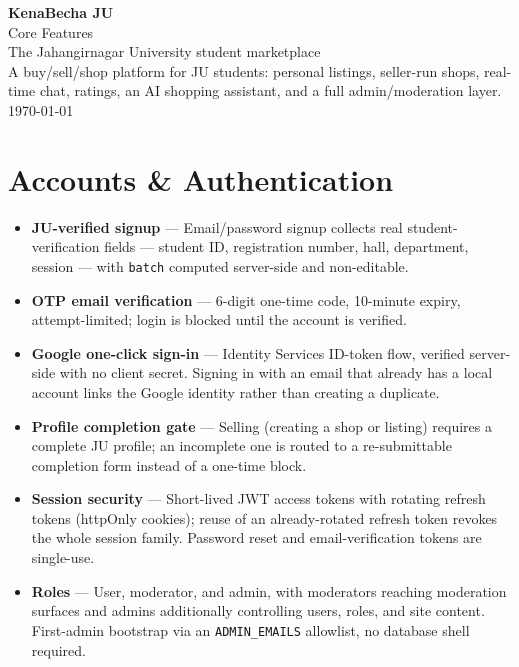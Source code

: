 \documentclass[11pt]{article}
\newcommand{\feature}[2]{%
  \item \textbf{#1} --- #2
}
\begin{document}
\begin{titlepage}
  \centering
  \vspace*{3cm}
  {\Huge\bfseries\color{brandgreen} KenaBecha JU}\\[0.4cm]
  {\Large\color{darktext} Core Features}\\[0.3cm]
  {\large\color{graytext} The Jahangirnagar University student marketplace}\\[2cm]
  {\normalsize\color{graytext} A buy/sell/shop platform for JU students: personal listings, seller-run shops, real-time chat, ratings, an AI shopping assistant, and a full admin/moderation layer.}
  \vfill
  {\small\color{graytext} \today}
\end{titlepage}

\tableofcontents
\newpage

\section{Accounts \& Authentication}
\begin{itemize}
  \feature{JU-verified signup}{Email/password signup collects real student-verification fields --- student ID, registration number, hall, department, session --- with \texttt{batch} computed server-side and non-editable.}
  \feature{OTP email verification}{6-digit one-time code, 10-minute expiry, attempt-limited; login is blocked until the account is verified.}
  \feature{Google one-click sign-in}{Identity Services ID-token flow, verified server-side with no client secret. Signing in with an email that already has a local account links the Google identity rather than creating a duplicate.}
  \feature{Profile completion gate}{Selling (creating a shop or listing) requires a complete JU profile; an incomplete one is routed to a re-submittable completion form instead of a one-time block.}
  \feature{Session security}{Short-lived JWT access tokens with rotating refresh tokens (httpOnly cookies); reuse of an already-rotated refresh token revokes the whole session family. Password reset and email-verification tokens are single-use.}
  \feature{Roles}{User, moderator, and admin, with moderators reaching moderation surfaces and admins additionally controlling users, roles, and site content. First-admin bootstrap via an \texttt{ADMIN\_EMAILS} allowlist, no database shell required.}
\end{itemize}
\end{document}
